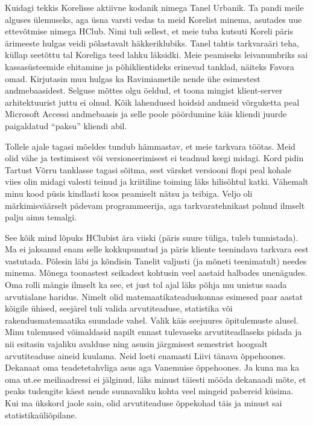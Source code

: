 Kuidagi tekkis Korelisse aktiivne kodanik nimega Tanel 
Urbanik. Ta pandi meile alguses ülemuseks, aga üsna 
varsti vedas ta meid Korelist minema, asutades uue ettevõtmise nimega HClub. 
Nimi tuli sellest, et meie tuba kutsuti Koreli päris ärimeeste hulgas veidi põlastavalt 
häkkeriklubiks. Tanel tahtis tarkvaraäri teha, küllap seetõttu tal 
Koreliga teed lahku läksidki. Meie peamiseks leivanumbriks sai kassasüsteemide 
ehitamine ja põhiklientideks erinevad tanklad, näiteks Favora omad. 
Kirjutasin muu hulgas ka Ravimiametile nende ühe 
esimestest andmebaasidest. Selguse mõttes olgu öeldud, et toona mingist 
klient-server arhitektuurist juttu ei olnud. Kõik lahendused hoidsid andmeid 
võrguketta peal Microsoft Accessi andmebaasis ja selle 
poole pöördumine käis kliendi juurde paigaldatud \enquote{paksu} kliendi abil. 

Tollele ajale tagasi mõeldes tundub hämmastav, et meie tarkvara töötas. Meid 
olid vähe ja testimisest või versioneerimisest ei 
teadnud keegi midagi. Kord pidin Tartust Võrru tanklasse tagasi 
sõitma, sest värsket versiooni flopi peal kohale viies olin midagi valesti 
teinud ja kriitiline toiming läks hilisõhtul katki. Vähemalt minu kood püsis 
kindlasti koos peamiselt nätsu ja teibiga. Veljo oli märkimisväärselt pädevam programmeerija, aga tarkvaratehnikast polnud 
ilmselt palju aimu temalgi. 

See kõik mind lõpuks HClubist ära viiski (päris suure tüliga, tuleb tunnistada). Ma 
ei jaksanud enam selle kokkupunutud ja päris kliente teenindava tarkvara 
eest vastutada. Põlesin läbi ja kõndisin Tanelit valjusti (ja mõneti teenimatult) needes minema. 
Mõnega toonastest seikadest kohtusin veel aastaid halbades unenägudes. Oma rolli mängis 
ilmselt ka see, et just tol ajal läks põhja mu 
unistus saada arvutialane haridus. Nimelt olid matemaatikateaduskonnas 
esimesed paar aastat kõigile ühised, seejärel tuli valida arvutiteaduse, 
statistika või rakendusmatemaatika suundade vahel. Valik käis seejuures õpitulemuste 
alusel. Minu tulemused võimaldasid napilt ennast tulevaseks arvutiteadlaseks pidada ja 
nii esitasin vajaliku avalduse ning asusin järgmisest semestrist hoogsalt 
arvutiteaduse aineid kuulama. Neid loeti enamasti Liivi tänava 
õppehoones. 
Dekanaat oma teadetetahvliga asus aga Vanemuise õppehoones. Ja kuna ma ka oma 
ut.ee meiliaadressi ei jälginud, läks minust täiesti mööda dekanaadi mõte, et 
peaks tudengite käest nende suunavaliku kohta veel mingeid pabereid küsima. 
Kui ma ükskord jaole sain, olid 
arvutiteaduse õppekohad täis ja minust sai statistikaüliõpilane. 

